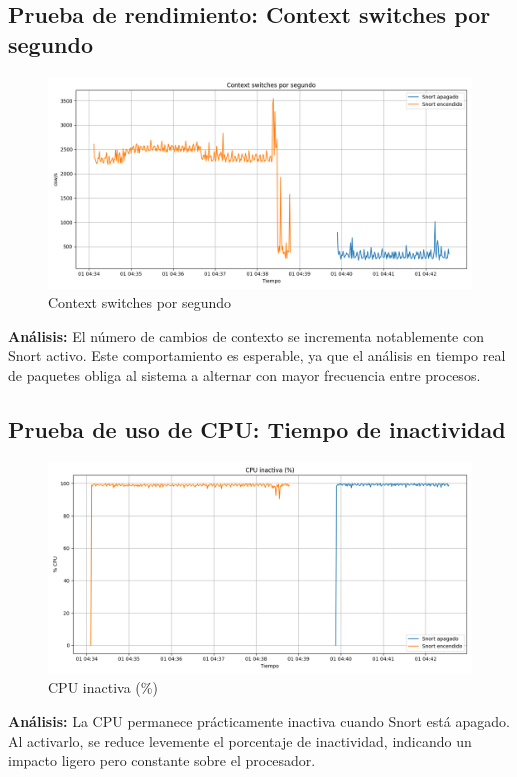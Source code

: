 \documentclass[11pt,a4paper,twoside]{report}
\begin{document}
\subsection*{Prueba de rendimiento: Context switches por segundo}

\begin{figure}[H]
	\centering
	\includegraphics[width=\textwidth]{graficas/context_switch.png}
	\caption{Context switches por segundo}
\end{figure}
\textbf{Análisis:} El número de cambios de contexto se incrementa notablemente con Snort activo. Este comportamiento es esperable, ya que el análisis en tiempo real de paquetes obliga al sistema a alternar con mayor frecuencia entre procesos.

\subsection*{Prueba de uso de CPU: Tiempo de inactividad}

\begin{figure}[H]
	\centering
	\includegraphics[width=\textwidth]{graficas/cpu_idle.png}
	\caption{CPU inactiva (\%)}
\end{figure}
\textbf{Análisis:} La CPU permanece prácticamente inactiva cuando Snort está apagado. Al activarlo, se reduce levemente el porcentaje de inactividad, indicando un impacto ligero pero constante sobre el procesador.
\end{document}
